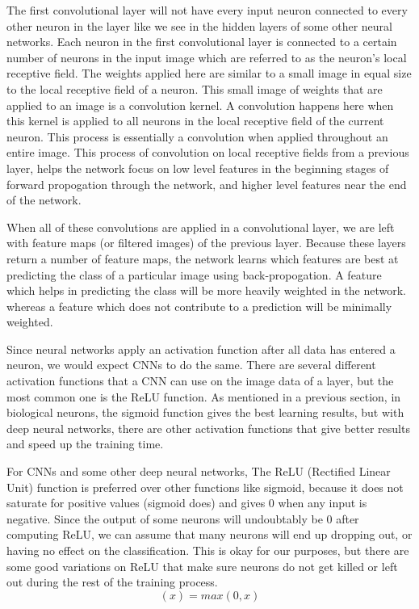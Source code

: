 \documentclass[12pt]{report} %
\begin{document}
	The first convolutional layer will not have every input neuron connected to every other neuron in the layer like we see in the hidden layers of some other neural networks. Each neuron in the first convolutional layer is connected to a certain number of neurons in the input image which are referred to as the neuron's local receptive field. The weights applied here are similar to a small image in equal size to the local receptive field of a neuron. This small image of weights that are applied to an image is a convolution kernel. A convolution happens here when this kernel is applied to all neurons in the local receptive field of the current neuron. This process is essentially a convolution when applied throughout an entire image. This process of convolution on local receptive fields from a previous layer, helps the network focus on low level features in the beginning stages of forward propogation through the network, and higher level features near the end of the network.\cite{aurelienMachineLearning} 
	
	When all of these convolutions are applied in a convolutional layer, we are left with feature maps (or filtered images) of the previous layer. Because these layers return a number of feature maps, the network learns which features are best at predicting the class of a particular image using back-propogation. A feature which helps in predicting the class will be more heavily weighted in the network. whereas a feature which does not contribute to a prediction will be minimally weighted.
	
	Since neural networks apply an activation function after all data has entered a neuron, we would expect CNNs to do the same. There are several different activation functions that a CNN can use on the image data of a layer, but the most common one is the ReLU function. As mentioned in a previous section, in biological neurons, the sigmoid function gives the best learning results, but with deep neural networks, there are other activation functions that give better results and speed up the training time.\cite{krizhevsky2012imagenet} 
	
	For CNNs and some other deep neural networks, The ReLU (Rectified Linear Unit) function is preferred over other functions like sigmoid, because it does not saturate for positive values (sigmoid does) and gives 0 when any input is negative. Since the output of some neurons will undoubtably be 0 after computing ReLU, we can assume that many neurons will end up dropping out, or having no effect on the classification. This is okay for our purposes, but there are some good variations on ReLU that make sure neurons do not get killed or left out during the rest of the training process. \cite{aurelienMachineLearning} 
 \begin{equation}	
 (x) = max(0, x)%
 \end{equation}
 
\end{document}

